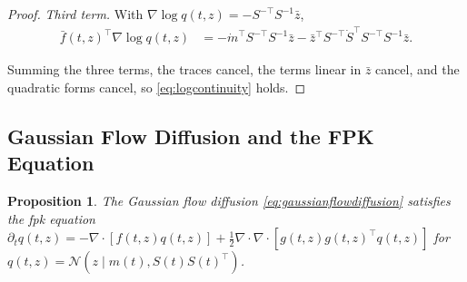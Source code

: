 \documentclass{article} %
\newcommand{\postdrift}{f}
\newcommand{\odedrift}{\bar f}
\newcommand{\vol}{g}
\newcommand{\Norm}{\mathcal{N}}
\newtheorem{proposition}[theorem]{Proposition}
\begin{document}
\begin{proof}
\emph{Third term.} With $\nabla \log q(t, z) = -S^{-\top} S^{-1} \bar z$,
\begin{align*}
    \odedrift(t,z)^\top \nabla \log q(t, z) &= - \dot m^\top S^{-\top} S^{-1} \bar z - \bar z^\top S^{-\top} \dot S^\top S^{-\top} S^{-1} \bar z.
\end{align*}

Summing the three terms, the traces cancel, the terms linear in $\bar z$ cancel, and the quadratic forms cancel, so \cref{eq:logcontinuity} holds.
\end{proof}

\subsection{Gaussian Flow Diffusion and the FPK Equation}\label{sec:proofFPK}

\begin{proposition}
\label{prop:fpk}
The Gaussian flow diffusion \cref{eq:gaussianflowdiffusion} satisfies the \gls{fpk} equation $\partial_t q(t, z) = -\nabla \cdot [\postdrift(t,z) q(t, z)] + \frac{1}{2} \nabla \cdot\nabla \cdot[\vol(t,z) \vol(t,z)^\top q(t, z)]$ for $q(t, z) = \Norm(z \mid m(t), S(t)S(t)^\top)$.
\end{proposition}
\end{document}
